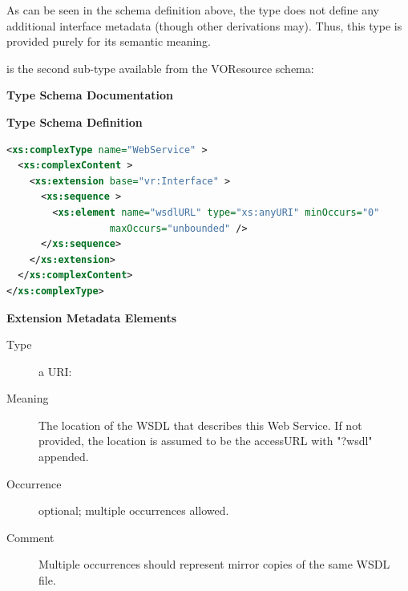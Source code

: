 \documentclass[11pt,a4paper]{ivoa}
\begin{document}


As can be seen in the schema definition above, the
 type does not define any additional
interface metadata (though other  derivations
may).  Thus, this type is provided purely for its semantic meaning.



 is the second 
sub-type available from the VOResource schema:

\begin{generated}
\begingroup
        \renewcommand*\descriptionlabel[1]{%
        \hbox to 5.5em{\emph{#1}\hfil}}\vspace{2ex}\noindent\textbf{ Type Schema Documentation}



\vspace{1ex}\noindent\textbf{ Type Schema Definition}

\begin{lstlisting}[language=XML,basicstyle=\footnotesize]
<xs:complexType name="WebService" >
  <xs:complexContent >
    <xs:extension base="vr:Interface" >
      <xs:sequence >
        <xs:element name="wsdlURL" type="xs:anyURI" minOccurs="0"
                  maxOccurs="unbounded" />
      </xs:sequence>
    </xs:extension>
  </xs:complexContent>
</xs:complexType>
\end{lstlisting}

\vspace{0.5ex}\noindent\textbf{ Extension Metadata Elements}

\begingroup\small\begin{bigdescription}\item[Element \xmlel{wsdlURL}]
\begin{description}
\item[Type] a URI: 
\item[Meaning]
                        The location of the WSDL that describes this
                        Web Service.  If not provided, the location is
                        assumed to be the accessURL with {"}?wsdl{"} appended.

\item[Occurrence] optional; multiple occurrences allowed.
\item[Comment]
                        Multiple occurrences should represent mirror copies of
                        the same WSDL file.


\end{description}


\end{bigdescription}\endgroup

\endgroup
\end{generated}
\end{document}
